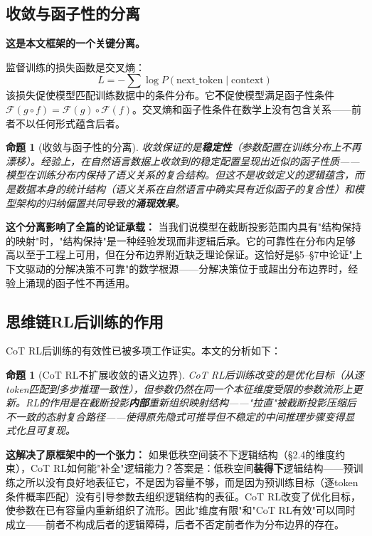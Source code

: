 \documentclass[11pt,a4paper]{ctexart}
\newtheorem{proposition}[theorem]{命题}
\begin{document}
\subsection{收敛与函子性的分离}

\textbf{这是本文框架的一个关键分离。}

监督训练的损失函数是交叉熵：
\begin{equation}
    L = -\sum \log P(\mathrm{next\_token} \mid \mathrm{context})
\end{equation}
该损失促使模型匹配训练数据中的条件分布。它\textbf{不}促使模型满足函子性条件$\mathcal{F}(g \circ f) = \mathcal{F}(g) \circ \mathcal{F}(f)$。交叉熵和函子性条件在数学上没有包含关系——前者不以任何形式蕴含后者。

\begin{proposition}[收敛与函子性的分离]
    收敛保证的是\textbf{稳定性}（参数配置在训练分布上不再漂移）。经验上，在自然语言数据上收敛到的稳定配置呈现出近似的函子性质——模型在训练分布内保持了语义关系的复合结构。但这不是收敛定义的逻辑蕴含，而是数据本身的统计结构（语义关系在自然语言中确实具有近似函子的复合性）和模型架构的归纳偏置共同导致的\textbf{涌现效果}。
\end{proposition}

\textbf{这个分离影响了全篇的论证承载：} 当我们说模型在截断投影范围内具有"结构保持的映射"时，"结构保持"是一种经验发现而非逻辑后承。它的可靠性在分布内足够高以至于工程上可用，但在分布边界附近缺乏理论保证。这恰好是§5--§7中论证"上下文驱动的分解决策不可靠"的数学根源——分解决策位于或超出分布边界时，经验上涌现的函子性不再适用。

\subsection{思维链RL后训练的作用}

CoT RL后训练的有效性已被多项工作证实\cite{OpenAI2024o1,Kaiser2025FirstPrinciples}。本文的分析如下：

\begin{proposition}[CoT RL不扩展收敛的语义边界]
    CoT RL后训练改变的是优化目标（从逐token匹配到多步推理一致性），但参数仍然在同一个本征维度受限的参数流形上更新。RL的作用是在截断投影\textbf{内部}重新组织映射结构——"拉直"被截断投影压缩后不一致的态射复合路径——使得原先隐式可推导但不稳定的中间推理步骤变得显式化且可复现。
\end{proposition}

\textbf{这解决了原框架中的一个张力：} 如果低秩空间装不下逻辑结构（§2.4的维度约束），CoT RL如何能"补全"逻辑能力？答案是：低秩空间\textbf{装得下}逻辑结构——预训练之所以没有良好地表征它，不是因为容量不够，而是因为预训练目标（逐token条件概率匹配）没有引导参数去组织逻辑结构的表征。CoT RL改变了优化目标，使参数在已有容量内重新组织了流形。因此"维度有限"和"CoT RL有效"可以同时成立——前者不构成后者的逻辑障碍，后者不否定前者作为分布边界的存在。
\end{document}
